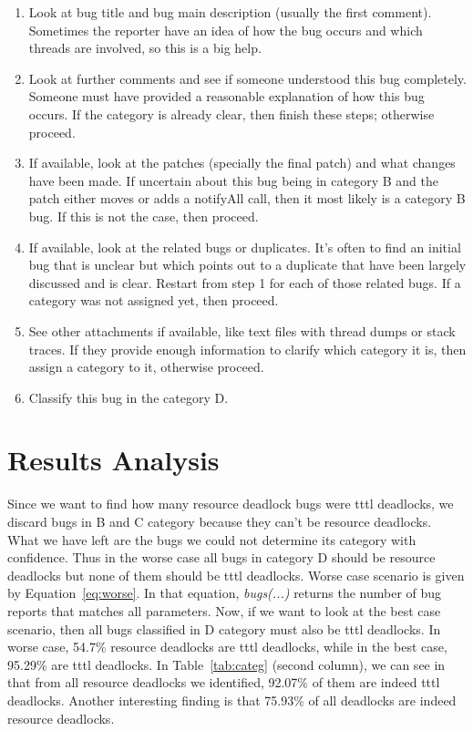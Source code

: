 \begin{enumerate}
\item Look at bug title and bug main description (usually the first comment). Sometimes the reporter have an idea of how the bug occurs and which threads are involved, so this is a big help.

\item Look at further comments and see if someone understood this bug completely. Someone must have provided a reasonable explanation of how this bug occurs. If the category is already clear, then finish these steps; otherwise proceed.

\item If available, look at the patches (specially the final patch) and what changes have been made. If uncertain about this bug being in category B and the patch either moves or adds a notifyAll call, then it most likely is a category B bug. If this is not the case, then proceed.

\item If available, look at the related bugs or duplicates. It's often to find an initial bug that is unclear but which points out to a duplicate that have been largely discussed and is clear. Restart from step 1 for each of those related bugs. If a category was not assigned yet, then proceed.

\item See other attachments if available, like text files with thread dumps or stack traces. If they provide enough information to clarify which category it is, then assign a category to it, otherwise proceed.

\item Classify this bug in the category D.
\end{enumerate}

\section{Results Analysis}

Since we want to find how many resource deadlock bugs were \ac{tttl} deadlocks, we discard bugs in B and C category because they can't be resource deadlocks. What we have left are the bugs we could not determine its category with confidence. Thus in the worse case all bugs in category D should be resource deadlocks but none of them should be \ac{tttl} deadlocks. Worse case scenario is given by Equation~\ref{eq:worse}. In that equation, \emph{bugs(...)} returns the number of bug reports that matches all parameters. Now, if we want to look at the best case scenario, then all bugs classified in D category must also be \ac{tttl} deadlocks. In worse case, 54.7\% resource deadlocks are \ac{tttl} deadlocks, while in the best case, 95.29\% are \ac{tttl} deadlocks. In Table~\ref{tab:categ} (second column), we can see in that from all resource deadlocks we identified, 92.07\% of them are indeed \ac{tttl} deadlocks.
Another interesting finding is that 75.93\% of all deadlocks are indeed resource deadlocks.

